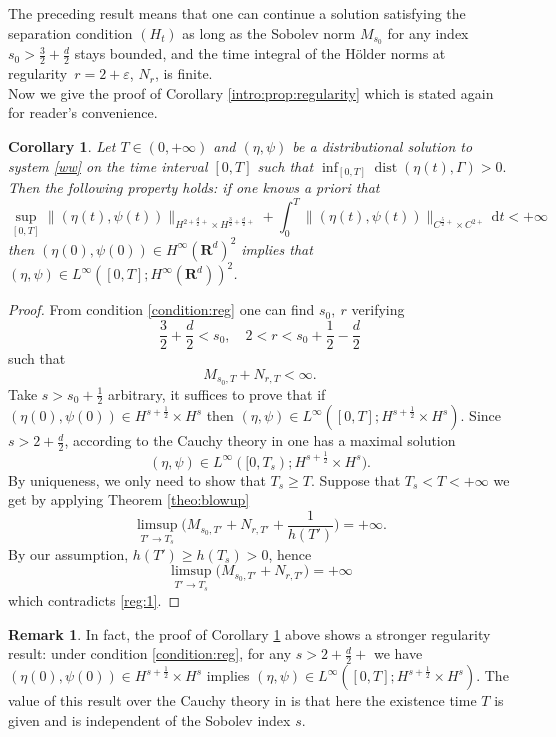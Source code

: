 \documentclass[11pt,english]{smfart}
\theoremstyle{plain}
\newtheorem{coro}[theo]{Corollary}
\theoremstyle{definition}
\newtheorem{rema}[theo]{Remark}
\numberwithin{equation}{section}
\begin{document}
The preceding result means that one can continue a solution satisfying the separation condition $(H_t)$ as long as the Sobolev norm $M_{s_0}$ for any index~$s_0>{\frac{3}{2}}+\frac d2$ stays bounded, and the time integral of the H\"older norms at regularity~$r=2+{\varepsilon}$, $N_r$, is finite. \\
{\hspace*{.15in}} Now we give the proof of Corollary \ref{intro:prop:regularity} which is stated again for reader's convenience.
\begin{coro}\label{theo:regularity}
Let $T\in (0, +\infty)$ and $(\eta, \psi)$ be a distributional solution to system \eqref{ww} on the time interval $[0, T]$  such that  $\inf_{[0, T]}\operatorname{dist}(\eta(t), \Gamma)>0.$ Then the following property holds: if one knows a priori that 
\begin{equation}\label{condition:reg}
\sup_{[0, T]}\| (\eta(t), \psi(t))\|_{H^{2+\frac{d}{2}+}\times H^{{\frac{3}{2}}+\frac{d}{2}+}}+\int_{0}^T\| (\eta(t), \psi(t))\|_{C^{\frac{5}{2}+}\times C^{2+}}{\,\mathrm{d}} t<+\infty
\end{equation}
 then $(\eta(0), \psi(0))\in  H^\infty({\mathbf{R}}^d)^2$ implies that $(\eta, \psi)\in  L^\infty([0, T]; H^\infty({\mathbf{R}}^d))^2$.
\end{coro}
\begin{proof}
From condition \eqref{condition:reg} one can find $s_0,~r$ verifying
	$$\frac32+\frac d2<s_0,\quad2<r<s_0+\frac12-\frac d2$$
such that 
\begin{equation}\label{reg:1}
M_{s_0, T}+N_{r,T}<\infty.
\end{equation}
Take $s>s_0+{\frac{1}{2}}$ arbitrary, it suffices to prove that if $(\eta(0), \psi(0))\in  H^{s+{\frac{1}{2}}}\times H^{s}$ then $(\eta, \psi)\in  L^\infty([0, T]; H^{s+{\frac{1}{2}}}\times H^{s})$. Since $s>2+\frac{d}{2}$, according to the Cauchy theory in \cite{ABZ1} one has a maximal solution 
\[
(\eta, \psi)\in  L^\infty([0, T_s); H^{s+{\frac{1}{2}}}\times H^{s}).
\]
By uniqueness, we only need to show that $T_s\ge T$. Suppose that $T_s<T<+\infty$ we get by applying Theorem \ref{theo:blowup}
	$$\limsup_{T'\rightarrow T_s}\Big( M_{s_0, T'}+N_{r, T'}+\frac{1}{h(T')}\Big)=+\infty.$$
By our assumption, $h(T')\ge h(T_s)>0$, hence
$$\limsup_{T'\rightarrow T_s}\Big( M_{s_0, T'}+N_{r, T'}\Big)=+\infty$$
which contradicts \eqref{reg:1}.
\end{proof}
\begin{rema}
In fact, the proof of Corollary \ref{theo:regularity} above shows  a stronger regularity result: under condition \eqref{condition:reg}, for any $s>2+\frac{d}{2}+$ we have $(\eta(0), \psi(0))\in  H^{s+{\frac{1}{2}}}\times H^{s}$ implies $(\eta, \psi)\in  L^\infty([0, T]; H^{s+{\frac{1}{2}}}\times H^{s})$. The value of this result over the Cauchy theory in \cite{ABZ1} is that here the existence time $T$ is given and is independent of the Sobolev index $s$.
\end{rema}
\end{document}
